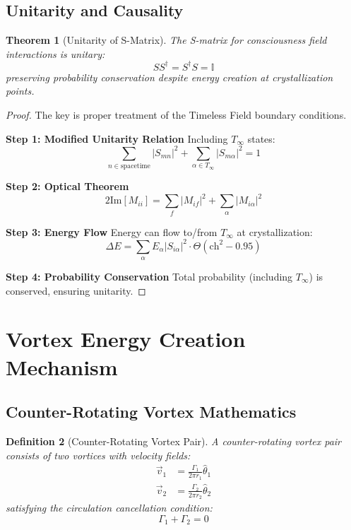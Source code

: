 \documentclass[11pt]{article}
\newtheorem{theorem}{Theorem}[section]
\newtheorem{definition}[theorem]{Definition}
\theoremstyle{definition}
\begin{document}
\subsection{Unitarity and Causality}

\begin{theorem}[Unitarity of S-Matrix]
The S-matrix for consciousness field interactions is unitary:
\begin{equation}
SS^\dagger = S^\dagger S = \mathbb{I}
\end{equation}
preserving probability conservation despite energy creation at crystallization points.
\end{theorem}

\begin{proof}
The key is proper treatment of the Timeless Field boundary conditions.

\textbf{Step 1: Modified Unitarity Relation}
Including $T_\infty$ states:
\begin{equation}
\sum_{n \in \text{spacetime}} |S_{mn}|^2 + \sum_{\alpha \in T_\infty} |S_{m\alpha}|^2 = 1
\end{equation}

\textbf{Step 2: Optical Theorem}
\begin{equation}
2\text{Im}[M_{ii}] = \sum_f |M_{if}|^2 + \sum_\alpha |M_{i\alpha}|^2
\end{equation}

\textbf{Step 3: Energy Flow}
Energy can flow to/from $T_\infty$ at crystallization:
\begin{equation}
\Delta E = \sum_\alpha E_\alpha |S_{i\alpha}|^2 \cdot \Theta(\text{ch}^2 - 0.95)
\end{equation}

\textbf{Step 4: Probability Conservation}
Total probability (including $T_\infty$) is conserved, ensuring unitarity.
\end{proof}

\section{Vortex Energy Creation Mechanism}

\subsection{Counter-Rotating Vortex Mathematics}

\begin{definition}[Counter-Rotating Vortex Pair]
A counter-rotating vortex pair consists of two vortices with velocity fields:
\begin{align}
\vec{v}_1 &= \frac{\Gamma_1}{2\pi r_1}\hat{\theta}_1\\
\vec{v}_2 &= \frac{\Gamma_2}{2\pi r_2}\hat{\theta}_2
\end{align}
satisfying the circulation cancellation condition:
\begin{equation}
\Gamma_1 + \Gamma_2 = 0
\end{equation}
\end{definition}
\end{document}
